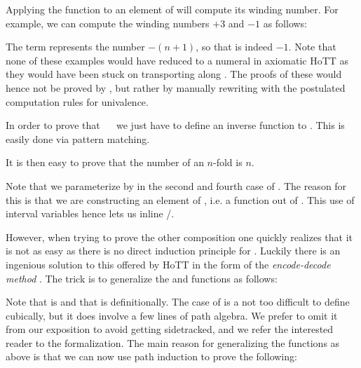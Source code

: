 Applying the  function to an element of  will
compute its winding number. For example, we can compute the winding
numbers $+3$ and $-1$ as follows:
%

The term   represents the number $- (n+1)$, so that
  is indeed $-1$. Note that none of these examples
would have reduced to a numeral in axiomatic HoTT as they would have been stuck
on transporting along . The proofs of these would hence not
be proved by , but rather by manually rewriting with the
postulated computation rules for univalence.

In order to prove that  \ \  we just have
to define an inverse function to . This is easily done
via pattern matching.
%


It is then easy to prove that the  number of an $n$-fold
 is $n$.
%

Note that we parameterize by  in the second and fourth case of
. The reason for this is that we are constructing
an element of , i.e. a function out of . This use of
interval variables hence lets us inline /.

However, when trying to prove the other composition one quickly
realizes that it is not as easy as there is no direct induction
principle for .
Luckily there is an ingenious solution to
this offered by HoTT in the form of the \emph{encode-decode method}
. The trick is to generalize the
 and  functions as follows:
%

Note that   is  and that
  is  definitionally. The
 case of  is a not too difficult to define cubically,
but it does involve a few lines of path algebra. We prefer to omit
it from our exposition to avoid getting sidetracked, and we refer
the interested reader to the formalization.
% 
The main reason for generalizing the functions as above
is that we can now use path induction to prove the following:
%

